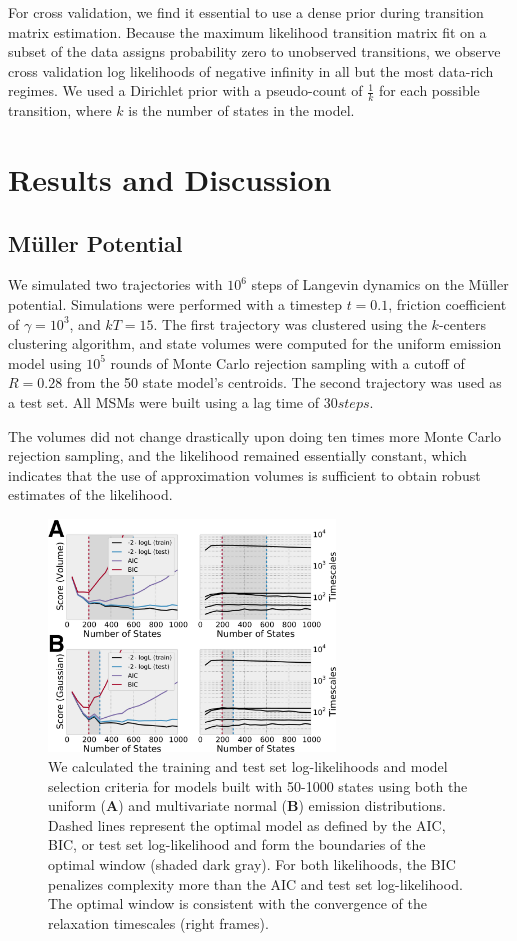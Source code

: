 \documentclass[journal=jpcbfk, layout=twocolumn, manuscript=article]{achemso}
\begin{document}
For cross validation, we find it essential to use a dense prior during transition matrix estimation. Because the maximum likelihood transition matrix fit on a subset of the data assigns probability zero to unobserved transitions, we observe cross validation log likelihoods of negative infinity in all but the most data-rich regimes. We used a Dirichlet prior with a pseudo-count of $\frac{1}{k}$ for each possible transition, where $k$ is the number of states in the model.

\section{Results and Discussion}
\subsection{M\"{u}ller Potential}
We simulated two trajectories with $10^6$ steps of Langevin dynamics on the M\"{u}ller potential\cite{Muller1980Reaction}. Simulations were performed with a timestep $t=0.1$, friction coefficient of $\gamma=10^3$, and $kT=15$. The first trajectory was clustered using the $k$-centers clustering algorithm, and state volumes were computed for the uniform emission model using $10^5$ rounds of Monte Carlo rejection sampling with a cutoff of $R=0.28$ from the 50 state model's centroids. The second trajectory was used as a test set. All MSMs were built using a lag time of $30 steps$.

The volumes did not change drastically upon doing ten times more Monte Carlo rejection sampling, and the likelihood remained essentially constant, which indicates that the use of approximation volumes is sufficient to obtain robust estimates of the likelihood. 

\begin{figure}[h]
\centering
\includegraphics[width=3in]{figs_final/mull_likes.png}
\caption{We calculated the training and test set log-likelihoods and model selection criteria for models built with 50-1000 states using both the uniform ({\bf A}) and multivariate normal ({\bf B}) emission distributions. Dashed lines represent the optimal model as defined by the AIC, BIC, or test set log-likelihood and form the boundaries of the optimal window (shaded dark gray). For both likelihoods, the BIC penalizes complexity more than the AIC and test set log-likelihood. The optimal window is consistent with the convergence of the relaxation timescales (right frames).}
\label{fig:mullerlike}
\end{figure}
\end{document}
